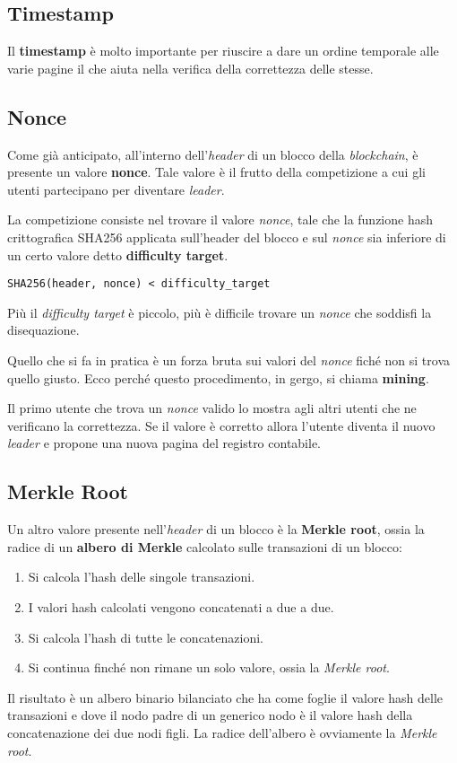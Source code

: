 \subsection{Timestamp}
Il \textbf{timestamp} \`e molto importante per riuscire a dare un ordine temporale alle varie pagine il che aiuta nella
verifica della correttezza delle stesse.

\subsection{Nonce}
Come gi\`a anticipato, all'interno dell'\emph{header} di un blocco della \emph{blockchain}, \`e presente un valore
\textbf{nonce}. Tale valore \`e il frutto della competizione a cui gli utenti partecipano per diventare \emph{leader}.

La competizione consiste nel trovare il valore \emph{nonce}, tale che la funzione hash crittografica SHA256 applicata
sull'header del blocco e sul \emph{nonce} sia inferiore di un certo valore detto \textbf{difficulty target}.
\begin{center}
	\verb|SHA256(header, nonce) < difficulty_target|
\end{center}
Pi\`u il \emph{difficulty target} \`e piccolo, pi\`u \`e difficile trovare un \emph{nonce} che soddisfi la disequazione.

Quello che si fa in pratica \`e un forza bruta sui valori del \emph{nonce} fich\'e non si trova quello giusto. Ecco
perch\'e questo procedimento, in gergo, si chiama \textbf{mining}.

Il primo utente che trova un \emph{nonce} valido lo mostra agli altri utenti che ne verificano la correttezza. Se
il valore \`e corretto allora l'utente diventa il nuovo \emph{leader} e propone una nuova pagina del registro contabile.

\subsection{Merkle Root}
Un altro valore presente nell'\emph{header} di un blocco \`e la \textbf{Merkle root}, ossia la radice di un
\textbf{albero di Merkle} calcolato sulle transazioni di un blocco:
\begin{enumerate}
	\item Si calcola l'hash delle singole transazioni.
	\item I valori hash calcolati vengono concatenati a due a due.
	\item Si calcola l'hash di tutte le concatenazioni.
	\item Si continua finch\'e non rimane un solo valore, ossia la \emph{Merkle root}.
\end{enumerate}
Il risultato \`e un albero binario bilanciato che ha come foglie il valore hash delle transazioni e dove il nodo padre
di un generico nodo \`e il valore hash della concatenazione dei due nodi figli. La radice dell'albero \`e ovviamente la
\emph{Merkle root}.

